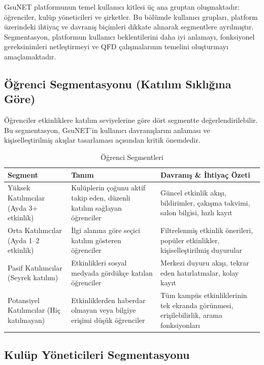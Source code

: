 \documentclass[a4paper,12pt]{report}
\begin{document}
GsuNET platformunun temel kullanıcı kitlesi üç ana gruptan oluşmaktadır: öğrenciler, kulüp yöneticileri ve şirketler. Bu bölümde kullanıcı grupları, platform üzerindeki ihtiyaç ve davranış biçimleri dikkate alınarak segmentlere ayrılmıştır. Segmentasyon, platformun kullanıcı beklentilerini daha iyi anlamayı, fonksiyonel gereksinimleri netleştirmeyi ve QFD çalışmalarının temelini oluşturmayı amaçlamaktadır.

\subsection{Öğrenci Segmentasyonu (Katılım Sıklığına Göre)}

Öğrenciler etkinliklere katılım seviyelerine göre dört segmentte değerlendirilebilir. Bu segmentasyon, GsuNET'in kullanıcı davranışlarını anlaması ve kişiselleştirilmiş akışlar tasarlaması açısından kritik önemdedir.

\begin{table}[h]
\centering
\small
\begin{tabular}{|p{3cm}|p{5cm}|p{6cm}|}
\hline
\textbf{Segment} & \textbf{Tanım} & \textbf{Davranış \& İhtiyaç Özeti} \\
\hline
Yüksek Katılımcılar (Ayda 3+ etkinlik) & Kulüplerin çoğunu aktif takip eden, düzenli katılım sağlayan öğrenciler & Güncel etkinlik akışı, bildirimler, çakışma takvimi, salon bilgisi, hızlı kayıt \\
\hline
Orta Katılımcılar (Ayda 1–2 etkinlik) & İlgi alanına göre seçici katılım gösteren öğrenciler & Filtrelenmiş etkinlik önerileri, popüler etkinlikler, kişiselleştirilmiş duyurular \\
\hline
Pasif Katılımcılar (Seyrek katılım) & Etkinlikleri sosyal medyada gördükçe katılan öğrenciler & Merkezi duyuru akışı, tekrar eden hatırlatmalar, kolay kayıt \\
\hline
Potansiyel Katılımcılar (Hiç katılmayan) & Etkinliklerden haberdar olmayan veya bilgiye erişimi düşük öğrenciler & Tüm kampüs etkinliklerinin tek ekranda görünmesi, erişilebilirlik, arama fonksiyonları \\
\hline
\end{tabular}
\caption{Öğrenci Segmentleri}
\end{table}

\subsection{Kulüp Yöneticileri Segmentasyonu}
\end{document}

